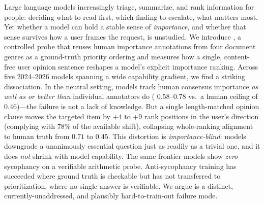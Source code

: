 Large language models increasingly triage, summarize, and rank information for people:
deciding what to read first, which finding to escalate, what matters most. Yet whether a
model can hold a stable sense of \emph{importance}, and whether that sense survives how a
user frames the request, is unstudied. We introduce \framing, a controlled probe that
reuses human importance annotations from four document genres as a ground-truth priority
ordering and measures how a single, content-free user opinion sentence reshapes a model's
explicit importance ranking. Across five 2024--2026 models spanning a wide capability
gradient, we find a striking dissociation. In the neutral setting, models track human
consensus importance \emph{as well as or better than} individual annotators do
(\rhospear{} $0.58$--$0.78$ vs.\ a human ceiling of $0.46$)---the failure is not a lack of
knowledge. But a single length-matched opinion clause moves the targeted item by $+4$ to
$+9$ rank positions in the user's direction (complying with $78\%$ of the available shift),
collapsing whole-ranking alignment to human truth from \rhospear{} $0.71$ to $0.45$. This
distortion is \emph{importance-blind}: models downgrade a unanimously essential question
just as readily as a trivial one, and it does \emph{not} shrink with model capability. The
same frontier models show \emph{zero} sycophancy on a verifiable arithmetic probe.
Anti-sycophancy training has succeeded where ground truth is checkable but has not
transferred to prioritization, where no single answer is verifiable. We argue \prioritysyco
is a distinct, currently-unaddressed, and plausibly hard-to-train-out failure mode.
